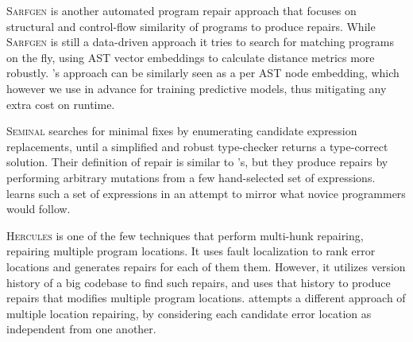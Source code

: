 \textsc{Sarfgen} \citep{Wang_2018} is another automated program repair approach
that focuses on structural and control-flow similarity of programs to produce
repairs. While \textsc{Sarfgen} is still a data-driven approach it tries to
search for matching programs on the fly, using AST vector embeddings to
calculate distance metrics more robustly. \toolname's approach can be similarly
seen as a per AST node embedding, which however we use in advance for training
predictive models, thus mitigating any extra cost on runtime.

\textsc{Seminal} \citep{Lerner2007-dt} searches for minimal fixes by enumerating
candidate expression replacements, until a simplified and robust type-checker
returns a type-correct solution. Their definition of repair is similar to
\toolname's, but they produce repairs by performing arbitrary mutations from a
few hand-selected set of expressions. \toolname learns such a set of expressions
in an attempt to mirror what novice programmers would follow.

\textsc{Hercules} \citep{Saha_2019} is one of the few techniques that perform
multi-hunk repairing, \ie repairing multiple program locations. It uses fault
localization to rank error locations and generates repairs for each of them
them. However, it utilizes version history of a big codebase to find such
repairs, and uses that history to produce repairs that modifies multiple program
locations. \toolname attempts a different approach of multiple location
repairing, by considering each candidate error location as independent from one
another.
